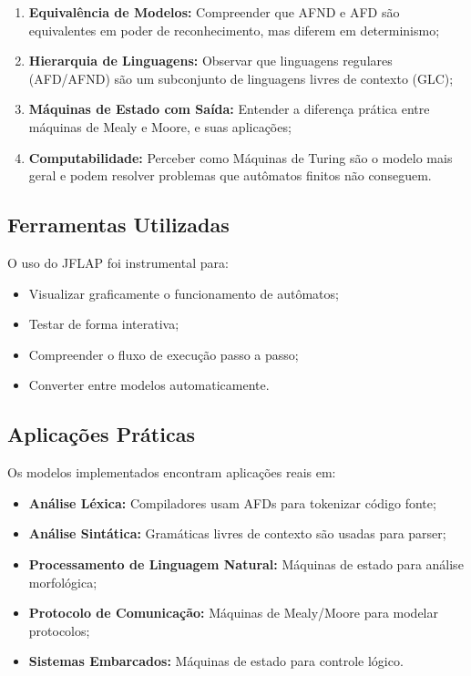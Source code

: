 \documentclass[12pt,a4paper]{article}
\begin{document}
\begin{enumerate}
    \item \textbf{Equivalência de Modelos:} Compreender que AFND e AFD são equivalentes em poder de reconhecimento, mas diferem em determinismo;
    
    \item \textbf{Hierarquia de Linguagens:} Observar que linguagens regulares (AFD/AFND) são um subconjunto de linguagens livres de contexto (GLC);
    
    \item \textbf{Máquinas de Estado com Saída:} Entender a diferença prática entre máquinas de Mealy e Moore, e suas aplicações;
    
    \item \textbf{Computabilidade:} Perceber como Máquinas de Turing são o modelo mais geral e podem resolver problemas que autômatos finitos não conseguem.
\end{enumerate}

\subsection{Ferramentas Utilizadas}

O uso do JFLAP foi instrumental para:
\begin{itemize}
    \item Visualizar graficamente o funcionamento de autômatos;
    \item Testar de forma interativa;
    \item Compreender o fluxo de execução passo a passo;
    \item Converter entre modelos automaticamente.
\end{itemize}

\subsection{Aplicações Práticas}

Os modelos implementados encontram aplicações reais em:

\begin{itemize}
    \item \textbf{Análise Léxica:} Compiladores usam AFDs para tokenizar código fonte;
    \item \textbf{Análise Sintática:} Gramáticas livres de contexto são usadas para parser;
    \item \textbf{Processamento de Linguagem Natural:} Máquinas de estado para análise morfológica;
    \item \textbf{Protocolo de Comunicação:} Máquinas de Mealy/Moore para modelar protocolos;
    \item \textbf{Sistemas Embarcados:} Máquinas de estado para controle lógico.
\end{itemize}
\end{document}
